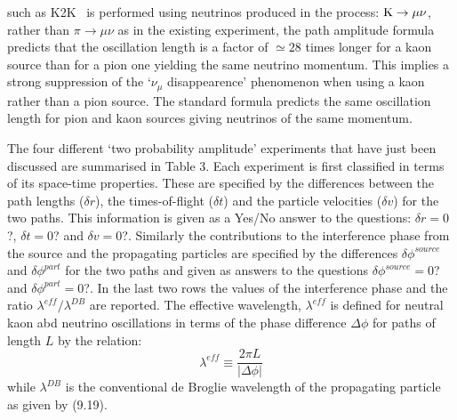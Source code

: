 \documentclass [12pt]{article}
\begin{document}
{ such as K2K~\cite{K2K} is performed using neutrinos produced in the process: ${\rm K} \rightarrow \mu \nu$, rather 
  than $\pi \rightarrow \mu \nu$ as in the existing experiment, the path amplitude formula predicts
   that the oscillation length is a factor of $\simeq 28$ times longer for a kaon source than
   for a pion one yielding the same neutrino momentum. This implies a strong suppression
  of the `$\nu_{\mu}$ disappearence' phenomenon when using a kaon rather than a pion source. The
   standard formula predicts the same oscillation length for pion and kaon sources giving
  neutrinos of the same momentum.
   \par The four different `two probability amplitude' experiments that have just been discussed
 are summarised in Table 3. Each experiment is first classified in terms of its space-time properties.
 These are specified by the differences between the path lengths ($\delta r$), the
 times-of-flight ($\delta t$) and the particle velocities ($\delta v$) for the two paths. This information is
 given as a Yes/No answer to the questions:  $\delta r = 0$?,  $\delta t = 0$? and  $\delta v = 0$?.
 Similarly the contributions to the interference phase from the source and the propagating
 particles are specified by the differences $\delta \phi^{source}$ and $\delta \phi^{part}$ for the two paths
 and given as answers to the questions $\delta \phi^{source} = 0$? and  $\delta \phi^{part} = 0$?.
 In the last two rows the values of the interference phase and the ratio $\lambda^{eff}/\lambda^{DB}$
 are reported.  The effective wavelength, $\lambda^{eff}$ is defined for neutral kaon 
  abd neutrino oscillations in terms of the
  phase difference $\Delta \phi$ for paths of length $L$ by the relation:
 \begin{equation}
  \lambda^{eff} \equiv \frac{2 \pi L}{|\Delta \phi|} 
 \end{equation}
 while $\lambda^{DB}$ is the conventional de Broglie wavelength of the propagating particle as given by
 (9.19).
   
}
\end{document}
